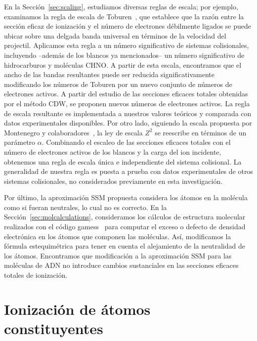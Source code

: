 En la Sección~\ref{sec:scaling}, estudiamos diversas reglas de escala; 
por ejemplo, examinamos la regla de escala de Toburen~\cite{Toburen:75,
Toburen:76}, que establece que la razón entre la sección eficaz de 
ionización y el número de electrones débilmente ligados se puede ubicar 
sobre una delgada banda universal en términos de la velocidad del 
projectil. Aplicamos esta regla a un número significativo de sistemas 
colisionales, incluyendo --además de los blancos ya mencionados-- un 
número significativo de hidrocarburos y moléculas CHNO. A partir de esta
escala, encontramos que el ancho de las bandas resultantes puede ser 
reducida significativamente modificando los números de Toburen por un 
nuevo conjunto de números de electrones activos. A partir del estudio de 
las secciones eficaces totales obtenidas por el método CDW, se proponen
nuevos números de electrones activos. La regla de escala resultante es 
implementada a nuestros valores teóricos y comparada con datos 
experimentales disponibles. Por otro lado, siguiendo la escala propuesta 
por Montenegro y colaboradores~\cite{Dubois:13,Montenegro:13}, la ley de 
escala $Z^2$ se reescribe en términos de un parámetro $\alpha$. 
Combinando el escaleo de las secciones eficaces totales con el número de 
electrones activos de los blancos y la carga del ion incidente, obtenemos 
una regla de escala única e independiente del sistema colisional. La 
generalidad de nuestra regla es puesta a prueba con datos experimentales 
de otros sistemas colisionales, no considerados previamente en esta 
investigación.

Por último, la aproximación SSM propuesta considera los átomos en la 
molécula como si fueran neutrales, lo cual no es correcto. En la 
Sección~\ref{sec:molcalculations}, consideramos los cálculos de 
estructura molecular realizados con el código {\sc gamess}~\cite{gamess} 
para computar el exceso o defecto de densidad electrónica en los átomos 
que componen las moléculas. Así, modificamos la fórmula estequimétrica 
para tener en cuenta el alejamiento de la neutralidad de los átomos. 
Encontramos que modificación a la aproximación SSM para las moléculas de 
ADN no introduce cambios sustanciales en las secciones eficaces totales 
de ionización.

\section{Ionización de átomos constituyentes}
\label{sec:atoms}

